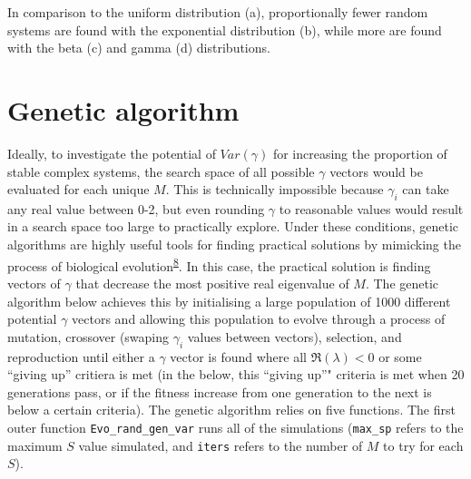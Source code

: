 \documentclass[]{article}
\begin{document}
In comparison to the uniform distribution (a), proportionally fewer
random systems are found with the exponential distribution (b), while
more are found with the beta (c) and gamma (d) distributions.

\hypertarget{ga}{\section{Genetic algorithm}\label{ga}}

Ideally, to investigate the potential of \(Var(\gamma)\) for increasing
the proportion of stable complex systems, the search space of all
possible \(\gamma\) vectors would be evaluated for each unique \(M\).
This is technically impossible because \(\gamma_{i}\) can take any real
value between 0-2, but even rounding \(\gamma\) to reasonable values
would result in a search space too large to practically explore. Under
these conditions, genetic algorithms are highly useful tools for finding
practical solutions by mimicking the process of biological
evolution\textsuperscript{\protect\hyperlink{ref-Hamblin2013}{8}}. In
this case, the practical solution is finding vectors of \(\gamma\) that
decrease the most positive real eigenvalue of \(M\). The genetic
algorithm below achieves this by initialising a large population of 1000
different potential \(\gamma\) vectors and allowing this population to
evolve through a process of mutation, crossover (swaping \(\gamma_{i}\)
values between vectors), selection, and reproduction until either a
\(\gamma\) vector is found where all \(\Re(\lambda) < 0\) or some
``giving up'' critiera is met (in the below, this ``giving up''"
criteria is met when 20 generations pass, or if the fitness increase
from one generation to the next is below a certain criteria). The
genetic algorithm relies on five functions. The first outer function
\texttt{Evo\_rand\_gen\_var} runs all of the simulations
(\texttt{max\_sp} refers to the maximum \(S\) value simulated, and
\texttt{iters} refers to the number of \(M\) to try for each \(S\)).
\end{document}
